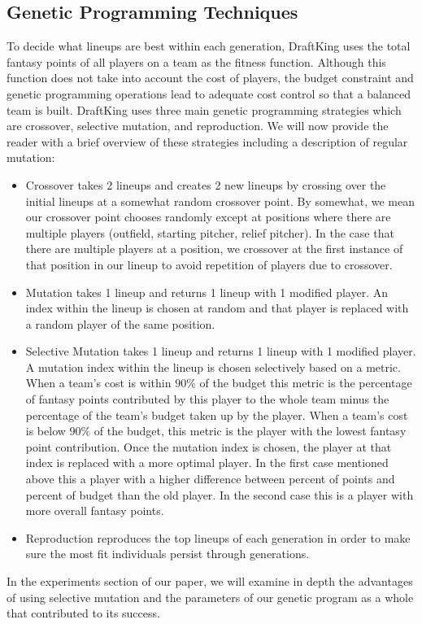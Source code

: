 \subsection{Genetic Programming Techniques}
\label{subsec:enum}
To decide what lineups are best within each generation, DraftKing uses the total fantasy points of all players on a team as the fitness function. Although this function does not take into account the cost of players, the budget constraint and genetic programming operations lead to adequate cost control so that a balanced team is built. DraftKing uses three main genetic programming strategies which are crossover, selective mutation, and reproduction. We will now provide the reader with a brief overview of these strategies including a description of regular mutation:
\begin{itemize}
	\item Crossover takes 2 lineups and creates 2 new lineups by crossing over the initial lineups at a somewhat random crossover point. By somewhat, we mean our crossover point chooses randomly except at positions where there are multiple players (outfield, starting pitcher, relief pitcher). In the case that there are multiple players at a position, we crossover at the first instance of that position in our lineup to avoid repetition of players due to crossover. 
    \item Mutation takes 1 lineup and returns 1 lineup with 1 modified player. An index within the lineup is chosen at random and that player is replaced with a random player of the same position.
	\item Selective Mutation takes 1 lineup and returns 1 lineup with 1 modified player. A mutation index within the lineup is chosen selectively based on a metric. When a team's cost is within $90\%$ of the budget this metric is the percentage of fantasy points contributed by this player to the whole team minus the percentage of the team's budget taken up by the player. When a team's cost is below $90\%$ of the budget, this metric is the player with the lowest fantasy point contribution. Once the mutation index is chosen, the player at that index is replaced with a more optimal player. In the first case mentioned above this a player with a higher difference between percent of points and percent of budget than the old player. In the second case this is a player with more overall fantasy points. 
	\item Reproduction reproduces the top lineups of each generation in order to make sure the most fit individuals persist through generations.
\end{itemize}

In the experiments section of our paper, we will examine in depth the advantages of using selective mutation and the parameters of our genetic program as a whole that contributed to its success. 





